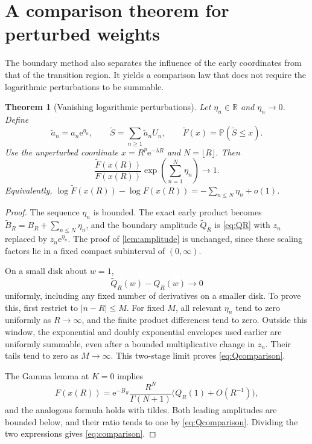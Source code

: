 \documentclass[11pt,a4paper]{article}
\numberwithin{equation}{section}
\newtheorem{theorem}{Theorem}[section]
\theoremstyle{definition}
\newcommand{\Prob}{\mathbb P}
\newcommand{\R}{\mathbb R}
\newcommand{\ee}{\mathrm e}
\begin{document}
\section{A comparison theorem for perturbed weights}
\label{sec:comparison}

The boundary method also separates the influence of the early coordinates from that of the transition region. It yields a comparison law that does not require the logarithmic perturbations to be summable.

\begin{theorem}[Vanishing logarithmic perturbations]
\label{thm:comparison}
Let $\eta_n\in\R$ and $\eta_n\to0$. Define
\begin{equation}
 \widetilde a_n=a_n\ee^{\eta_n},\qquad
 \widetilde S=\sum_{n\geq1}\widetilde a_nU_n,
 \qquad \widetilde F(x)=\Prob(\widetilde S\leq x).
 \label{eq:perturbed-model}
\end{equation}
Use the unperturbed coordinate $x=R^p\ee^{-\lambda R}$ and $N=\lfloor R\rfloor$. Then
\begin{equation}
 \boxed{\displaystyle
 \frac{\widetilde F(x(R))}{F(x(R))}
 \exp\left(\sum_{n=1}^N\eta_n\right)\longrightarrow1.}
 \label{eq:comparison}
\end{equation}
Equivalently,
$\log\widetilde F(x(R))-\log F(x(R))=-\sum_{n\leq N}\eta_n+o(1)$.
\end{theorem}

\begin{proof}
The sequence $\eta_n$ is bounded. The exact early product becomes
$\widetilde B_R=B_R+\sum_{n\leq N}\eta_n$, and the boundary amplitude
$\widetilde Q_R$ is \eqref{eq:QR} with $z_n$ replaced by $z_n\ee^{\eta_n}$. The proof of \cref{lem:amplitude} is unchanged, since these scaling factors lie in a fixed compact subinterval of $(0,\infty)$.

On a small disk about $w=1$,
\begin{equation}
 \widetilde Q_R(w)-Q_R(w)\longrightarrow0
 \label{eq:Qcomparison}
\end{equation}
uniformly, including any fixed number of derivatives on a smaller disk. To prove this, first restrict to $|n-R|\leq M$. For fixed $M$, all relevant $\eta_n$ tend to zero uniformly as $R\to\infty$, and the finite product differences tend to zero. Outside this window, the exponential and doubly exponential envelopes used earlier are uniformly summable, even after a bounded multiplicative change in $z_n$. Their tails tend to zero as $M\to\infty$. This two-stage limit proves \eqref{eq:Qcomparison}.

The Gamma lemma at $K=0$ implies
\[
 F(x(R))=\ee^{-B_R}\frac{R^N}{\Gamma(N+1)}
                 \bigl(Q_R(1)+O(R^{-1})\bigr),
\]
and the analogous formula holds with tildes. Both leading amplitudes are bounded below, and their ratio tends to one by \eqref{eq:Qcomparison}. Dividing the two expressions gives \eqref{eq:comparison}.
\end{proof}
\end{document}
